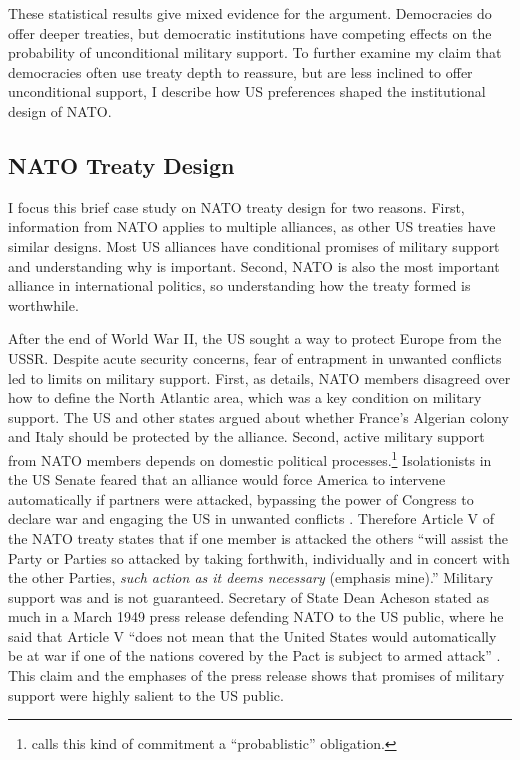 \documentclass[12pt]{article}
\begin{document}
These statistical results give mixed evidence for the argument. 
Democracies do offer deeper treaties, but democratic institutions have competing effects on the probability of unconditional military support. 
To further examine my claim that democracies often use treaty depth to reassure, but are less inclined to offer unconditional support, I describe how US preferences shaped the institutional design of NATO. 


\subsection{NATO Treaty Design}


I focus this brief case study on NATO treaty design for two reasons. 
First, information from NATO applies to multiple alliances, as other US treaties have similar designs. 
Most US alliances have conditional promises of military support and understanding why is important.
Second, NATO is also the most important alliance in international politics, so understanding how the treaty formed is worthwhile. 


After the end of World War II, the US sought a way to protect Europe from the USSR. 
Despite acute security concerns, fear of entrapment in unwanted conflicts led to limits on military support. 
First, as \citet{Poast2019a} details, NATO members disagreed over how to define the North Atlantic area, which was a key condition on military support. 
The US and other states argued about whether France's Algerian colony and Italy should be protected by the alliance. 
Second, active military support from NATO members depends on domestic political processes.\footnote{\citet{Benson2012} calls this kind of commitment a ``probablistic'' obligation.} 
Isolationists in the US Senate feared that an alliance would force America to intervene automatically if partners were attacked, bypassing the power of Congress to declare war and engaging the US in unwanted conflicts \citep[pg. 280-1]{Acheson1969}.
Therefore Article V of the NATO treaty states that if one member is attacked the others ``will assist the Party or Parties so attacked by taking forthwith, individually and in concert with the other Parties, \emph{such action as it deems necessary} (emphasis mine).'' 
Military support was and is not guaranteed. 
Secretary of State Dean Acheson stated as much in a March 1949 press release defending NATO to the US public, where he said that Article V ``does not mean that the United States would automatically be at war if one of the nations covered by the Pact is subject to armed attack'' \citep{Acheson1949}.
This claim and the emphases of the press release shows that promises of military support were highly salient to the US public.
\end{document}
